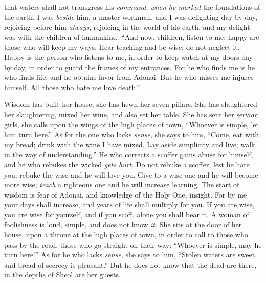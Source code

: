 \begin{biblechapter}
that waters shall not transgress his \textit{command}, 
\textit{when he marked} the foundations of the earth,
\verse I was \textit{beside} him, a master workman, 
and I was delighting day by day, 
rejoicing before him \textit{always},
\verse rejoicing in the world of his earth, 
and my delight was with the children of humankind.
 “And now, children, listen to me; 
happy are those who will keep my ways.
\verse Hear teaching and be wise; 
do not neglect it.
\verse Happy is the person who listens to me, 
in order to keep watch at my doors day by day, 
in order to guard the frames of my entrances.
\verse For he who finds me is he who finds life, 
and he obtains favor from Adonai.
\verse But he who misses me injures himself. 
All those who hate me love death.”
\end{biblechapter}

\begin{biblechapter} %
 Wisdom has built her house; 
she has hewn her seven pillars.
\verse She has slaughtered her slaughtering, mixed her wine, 
and also set her table.
\verse She has sent her servant girls, she calls 
upon the wings of the high places of town,
\verse “Whoever is simple, let him turn here.” 
As for the one who lacks \textit{sense}, she says to him,
\verse “Come, eat with my bread; 
drink with the wine I have mixed.
\verse Lay aside simplicity and live; 
walk in the way of understanding.”
\verse He who corrects a scoffer gains abuse for himself, 
and he who rebukes the wicked \textit{gets hurt}.
\verse Do not rebuke a scoffer, lest he hate you; 
rebuke the wise and he will love you.
\verse Give to a wise one and he will become more wise; 
\textit{teach} a righteous one and he will increase learning.
 The start of wisdom is fear of Adonai, 
and knowledge of the Holy One, insight.
\verse For by me your days shall increase, 
and years of life shall multiply for you.
\verse If you are wise, you are wise for yourself, 
and if you scoff, alone you shall bear it.
\verse A woman of foolishness is loud, 
simple, and does not know \textit{it}.
\verse She sits at the door of her house, 
upon a throne at the high places of town,
\verse in order to call to those who pass by the road, 
those who go straight on their way:
\verse “Whoever is simple, may he turn here!” 
As for he who lacks \textit{sense}, she says to him,
\verse “Stolen waters are sweet, 
and bread of secrecy is pleasant.”
\verse But he does not know that the dead are there, 
in the depths of Sheol are her guests.
\end{biblechapter}

